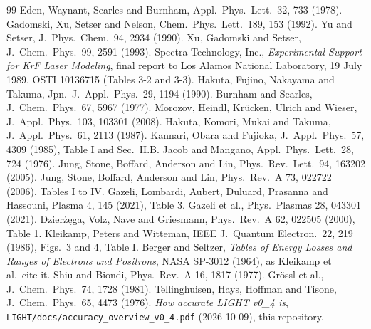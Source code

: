 \documentclass[11pt]{article}
\begin{document}
\begin{thebibliography}{99}
\footnotesize
\setlength{\itemsep}{1pt}
 Eden, Waynant, Searles and Burnham, Appl.\ Phys.\ Lett.\ 32, 733 (1978).
 Gadomski, Xu, Setser and Nelson, Chem.\ Phys.\ Lett.\ 189, 153 (1992).
 Yu and Setser, J.\ Phys.\ Chem.\ 94, 2934 (1990).
 Xu, Gadomski and Setser, J.\ Chem.\ Phys.\ 99, 2591 (1993).
 Spectra Technology, Inc., \emph{Experimental Support for KrF Laser Modeling}, final report to Los Alamos National Laboratory, 19 July 1989, OSTI 10136715 (Tables 3-2 and 3-3).
 Hakuta, Fujino, Nakayama and Takuma, Jpn.\ J.\ Appl.\ Phys.\ 29, 1194 (1990).
 Burnham and Searles, J.\ Chem.\ Phys.\ 67, 5967 (1977).
 Morozov, Heindl, Kr\"ucken, Ulrich and Wieser, J.\ Appl.\ Phys.\ 103, 103301 (2008).
 Hakuta, Komori, Mukai and Takuma, J.\ Appl.\ Phys.\ 61, 2113 (1987).
 Kannari, Obara and Fujioka, J.\ Appl.\ Phys.\ 57, 4309 (1985), Table I and Sec.\ II.B.
 Jacob and Mangano, Appl.\ Phys.\ Lett.\ 28, 724 (1976).
 Jung, Stone, Boffard, Anderson and Lin, Phys.\ Rev.\ Lett.\ 94, 163202 (2005).
 Jung, Stone, Boffard, Anderson and Lin, Phys.\ Rev.\ A 73, 022722 (2006), Tables I to IV.
 Gazeli, Lombardi, Aubert, Duluard, Prasanna and Hassouni, Plasma 4, 145 (2021), Table 3.
 Gazeli et al., Phys.\ Plasmas 28, 043301 (2021).
 Dzier\.z\k{e}ga, Volz, Nave and Griesmann, Phys.\ Rev.\ A 62, 022505 (2000), Table 1.
 Kleikamp, Peters and Witteman, IEEE J.\ Quantum Electron.\ 22, 219 (1986), Figs.\ 3 and 4, Table I.
 Berger and Seltzer, \emph{Tables of Energy Losses and Ranges of Electrons and Positrons}, NASA SP-3012 (1964), as Kleikamp et al.\ cite it.
 Shiu and Biondi, Phys.\ Rev.\ A 16, 1817 (1977).
 Gr\"ossl et al., J.\ Chem.\ Phys.\ 74, 1728 (1981).
 Tellinghuisen, Hays, Hoffman and Tisone, J.\ Chem.\ Phys.\ 65, 4473 (1976).
 \emph{How accurate LIGHT v0\_4 is}, \texttt{LIGHT/docs/accuracy\_overview\_v0\_4.pdf} (2026-10-09), this repository.
\end{thebibliography}
\end{document}
